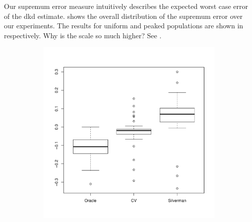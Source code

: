 Our \gls{supremum error} measure intuitively describes the expected worst case error of the \gls{dkd} estimate.
 shows the overall distribution of the \gls{supremum error} over our experiments.
The results for uniform and peaked populations are shown in  respectively.
Why is the scale so much higher? See .

\begin{figure}[htbp]
    \centering
    \begin{subfigure}[t]{0.45\textwidth}
        \includegraphics[width=\textwidth]{results/by_overall/relative-peak-bias-boxplot}
        \label{fig:discussion:overall_peakbias_boxplot:unif}
    \end{subfigure}
    \begin{subfigure}[t]{0.45\textwidth}

\end{subfigure}
\end{figure}
